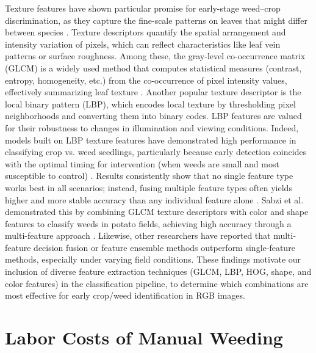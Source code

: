 \documentclass[letterpaper]{report}
\begin{document}
Texture features have shown particular promise for early-stage weed–crop discrimination, as they capture the fine-scale patterns on leaves that might differ between species \parencite{Garibaldi-Marquez2022-yn}. Texture descriptors quantify the spatial arrangement and intensity variation of pixels, which can reflect characteristics like leaf vein patterns or surface roughness. Among these, the gray-level co-occurrence matrix (GLCM) is a widely used method that computes statistical measures (contrast, entropy, homogeneity, etc.) from the co-occurrence of pixel intensity values, effectively summarizing leaf texture \parencite{Wu2021-gt,Chen2020-un}. Another popular texture descriptor is the local binary pattern (LBP), which encodes local texture by thresholding pixel neighborhoods and converting them into binary codes. LBP features are valued for their robustness to changes in illumination and viewing conditions. Indeed, models built on LBP texture features have demonstrated high performance in classifying crop vs. weed seedlings, particularly because early detection coincides with the optimal timing for intervention (when weeds are small and most susceptible to control) \parencite{Chen2020-un}. Results consistently show that no single feature type works best in all scenarios; instead, fusing multiple feature types often yields higher and more stable accuracy than any individual feature alone \parencite{Wu2021-gt,Chen2020-un}. Sabzi et al. demonstrated this by combining GLCM texture descriptors with color and shape features to classify weeds in potato fields, achieving high accuracy through a multi-feature approach \parencite{Wu2021-gt}. Likewise, other researchers have reported that multi-feature decision fusion or feature ensemble methods outperform single-feature methods, especially under varying field conditions. These findings motivate our inclusion of diverse feature extraction techniques (GLCM, LBP, HOG, shape, and color features) in the classification pipeline, to determine which combinations are most effective for early crop/weed identification in RGB images.

\section{Labor Costs of Manual Weeding}
\end{document}
